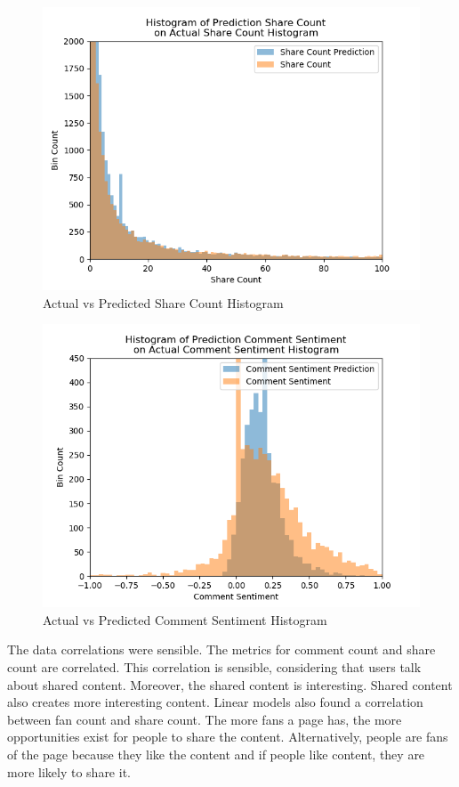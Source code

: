 \documentclass{article}
\begin{document}
\begin{figure}
\centering
\includegraphics[width=\columnwidth]{images/Share_Count_Prediction_vs_Actual.png}
\caption{Actual vs Predicted Share Count Histogram}
\label{share_count_histogram}
\end{figure}

\begin{figure}
\centering
\includegraphics[width=\columnwidth]{images/Sentiment_Prediction_vs_Actual.png}
\caption{Actual vs Predicted Comment Sentiment Histogram}
\label{comment_sentiment_histogram}
\end{figure}

The data correlations were sensible. The metrics for comment count and share count are correlated. This correlation is sensible, considering that users talk about shared content. Moreover, the shared content is interesting. Shared content also creates more interesting content. Linear models also found a correlation between fan count and share count. The more fans a page has, the more opportunities exist for people to share the content. Alternatively, people are fans of the page because they like the content and if people like content, they are more likely to share it. 
\end{document}
